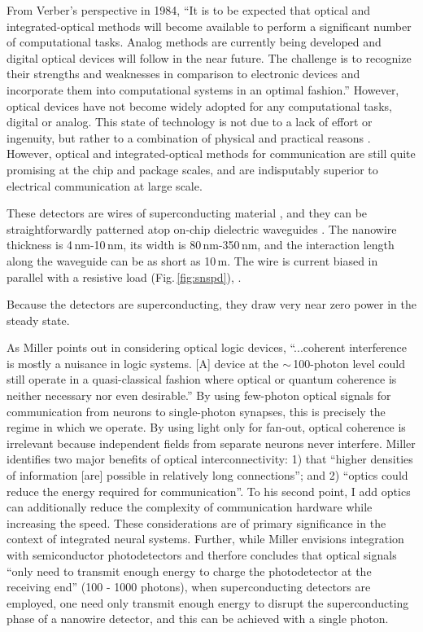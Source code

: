From Verber's perspective in 1984, ``It is to be expected that optical and integrated-optical methods will become available to perform a significant number of computational tasks. Analog methods are currently being developed and digital optical devices will follow in the near future. The challenge is to recognize their strengths and weaknesses in comparison to electronic devices and incorporate them into computational systems in an optimal fashion.'' \cite{ve1984} However, optical devices have not become widely adopted for any computational tasks, digital or analog. This state of technology is not due to a lack of effort or ingenuity, but rather to a combination of physical and practical reasons \cite{ke1985}. However, optical and integrated-optical methods for communication are still quite promising at the chip \cite{suwa2015} and package \cite{} scales, and are indisputably superior to electrical communication at large scale. 


\vspace{3em}
\cite{kafe2015} 

These detectors are wires of superconducting material \cite{mave2013}, and they can be straightforwardly patterned atop on-chip dielectric waveguides \cite{shbu2017b,x,y,z}. The nanowire thickness is 4\,nm-10\,nm, its width is 80\,nm-350\,nm, and the interaction length along the waveguide can be as short as 10\,\textmu m. The wire is current biased in parallel with a resistive load (Fig.\,\ref{fig:snspd}), .

Because the detectors are superconducting, they draw very near zero power in the steady state. 

\vspace{3em}
As Miller points out in considering optical logic devices, ``...coherent interference is mostly a nuisance in logic systems. [A] device at the $\sim$\,100-photon level could still operate in a quasi-classical fashion where optical or quantum coherence is neither necessary nor even desirable.'' \cite{mi2010} By using few-photon optical signals for communication from neurons to single-photon synapses, this is precisely the regime in which we operate. By using light only for fan-out, optical coherence is irrelevant because independent fields from separate neurons never interfere. Miller identifies two major benefits of optical interconnectivity: 1) that ``higher densities of information [are] possible in relatively long connections''; and 2) ``optics could reduce the energy required for communication''. \cite{mi2010} To his second point, I add optics can additionally reduce the complexity of communication hardware while increasing the speed. These considerations are of primary significance in the context of integrated neural systems. Further, while Miller envisions integration with semiconductor photodetectors and therfore concludes that optical signals ``only need to transmit enough energy to charge the photodetector at the receiving end'' (100 - 1000 photons), when superconducting detectors are employed, one need only transmit enough energy to disrupt the superconducting phase of a nanowire detector, and this can be achieved with a single photon. 


